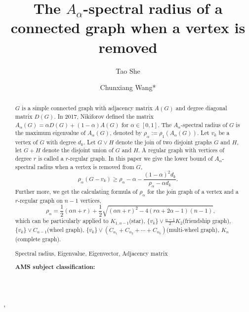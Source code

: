 \documentclass[amsthm]{elsart}
\begin{document}
\begin{frontmatter}
\title{The $A_{\alpha}$-spectral radius of a connected graph when a vertex is removed }

\journal{~~}

\author[CW]{Tao She},
\author[CW]{Chunxiang Wang*}

\address[CW]{ School of Mathematics and Statistics, Central China Normal University, Wuhan,  P.R. China}





\begin{abstract}
$G$ is a simple connected graph with adjacency matrix $A(G)$ and degree diagonal matrix $D(G)$.
 In 2017, Nikiforov  \cite{2016Merging} defined the matrix $A_{\alpha}(G) = \alpha D(G) + (1- \alpha)A(G)$ for $\alpha \in [0, 1].$
The $A_\alpha$-spectral radius of $G$ is the maximum eigenvalue of $A_\alpha(G)$, denoted by $\rho_\alpha := \rho_1(A_{\alpha}(G))$. Let $v_k$ be a vertex of $G$ with degree $d_k$. Let $G \vee H$ denote the join of two disjoint graphs $G$ and $H$, let $G + H$ denote the disjoint union of $G$ and $H$. A regular graph with vertices of degree $r$ is called a $r$-regular graph.
In this paper we give the lower bound of $A_\alpha$-spectral radius when a vertex is removed from $G$,
\begin{equation*}
\rho _\alpha (G - v_k)
  \geqslant \rho _\alpha - \alpha - \frac{(1 - \alpha)^2 d_k}{\rho _\alpha - \alpha d_k}.
\end{equation*}
Further more, we get the calculating formula of $\rho_\alpha$ for the join graph of a vertex and a $r$-regular graph on $n-1$ vertices,
\begin{equation*}
\quad \rho _\alpha = \frac{1}{2}(\alpha n + r) + \frac{1}{2} \sqrt{(\alpha n + r)^2 - 4 (r \alpha + 2 \alpha - 1) ( n - 1) },
\end{equation*}
which can be particularly applied to $K_{1,n-1}$(star), $\{v_k\} \vee \frac{n-1}{2} K_2$(friendship graph), $\{v_k\} \vee C_{n-1}$(wheel graph), $\{v_k\} \vee (C_{n_1} + C_{n_2} + \cdots + C_{n_k})  $(multi-wheel graph), $K_n$(complete graph).

\vskip 2mm   Spectral radius,  Eigenvalue,  Eigenvector,  Adjacency matrix

{\bf AMS subject classification:}


\end{abstract}


\end{frontmatter}
\end{document}

